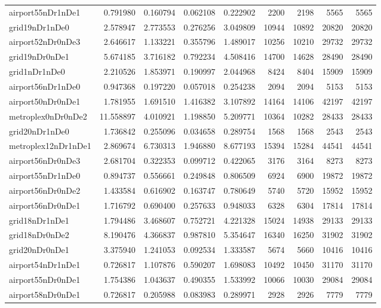 \begin{longtable}{|l|r|r|r|r|r|r|r|r|}
airport55nDr1nDe1 & 0.791980 & 0.160794 & 0.062108 & 0.222902 & 2200 & 2198 & 5565 & 5565 \\
grid19nDr1nDe0 & 2.578947 & 2.773553 & 0.276256 & 3.049809 & 10944 & 10892 & 20820 & 20820 \\
airport52nDr0nDe3 & 2.646617 & 1.133221 & 0.355796 & 1.489017 & 10256 & 10210 & 29732 & 29732 \\
grid19nDr0nDe1 & 5.674185 & 3.716182 & 0.792234 & 4.508416 & 14700 & 14628 & 28490 & 28490 \\
grid1nDr1nDe0 & 2.210526 & 1.853971 & 0.190997 & 2.044968 & 8424 & 8404 & 15909 & 15909 \\
airport56nDr1nDe0 & 0.947368 & 0.197220 & 0.057018 & 0.254238 & 2094 & 2094 & 5153 & 5153 \\
airport50nDr0nDe1 & 1.781955 & 1.691510 & 1.416382 & 3.107892 & 14164 & 14106 & 42197 & 42197 \\
metroplex0nDr0nDe2 & 11.558897 & 4.010921 & 1.198850 & 5.209771 & 10364 & 10282 & 28433 & 28433 \\
grid20nDr1nDe0 & 1.736842 & 0.255096 & 0.034658 & 0.289754 & 1568 & 1568 & 2543 & 2543 \\
metroplex12nDr1nDe1 & 2.869674 & 6.730313 & 1.946880 & 8.677193 & 15394 & 15284 & 44541 & 44541 \\
airport56nDr0nDe3 & 2.681704 & 0.322353 & 0.099712 & 0.422065 & 3176 & 3164 & 8273 & 8273 \\
airport55nDr1nDe0 & 0.894737 & 0.556661 & 0.249848 & 0.806509 & 6924 & 6900 & 19872 & 19872 \\
airport56nDr0nDe2 & 1.433584 & 0.616902 & 0.163747 & 0.780649 & 5740 & 5720 & 15952 & 15952 \\
airport56nDr0nDe1 & 1.716792 & 0.690400 & 0.257633 & 0.948033 & 6328 & 6304 & 17814 & 17814 \\
grid18nDr1nDe1 & 1.794486 & 3.468607 & 0.752721 & 4.221328 & 15024 & 14938 & 29133 & 29133 \\
grid18nDr0nDe2 & 8.190476 & 4.366837 & 0.987810 & 5.354647 & 16340 & 16250 & 31902 & 31902 \\
grid20nDr0nDe1 & 3.375940 & 1.241053 & 0.092534 & 1.333587 & 5674 & 5660 & 10416 & 10416 \\
airport54nDr1nDe1 & 0.726817 & 1.107876 & 0.590207 & 1.698083 & 10492 & 10450 & 31170 & 31170 \\
airport55nDr0nDe1 & 1.754386 & 1.043637 & 0.490355 & 1.533992 & 10066 & 10030 & 29084 & 29084 \\
airport58nDr0nDe1 & 0.726817 & 0.205988 & 0.083983 & 0.289971 & 2928 & 2926 & 7779 & 7779 \\

\end{longtable}
